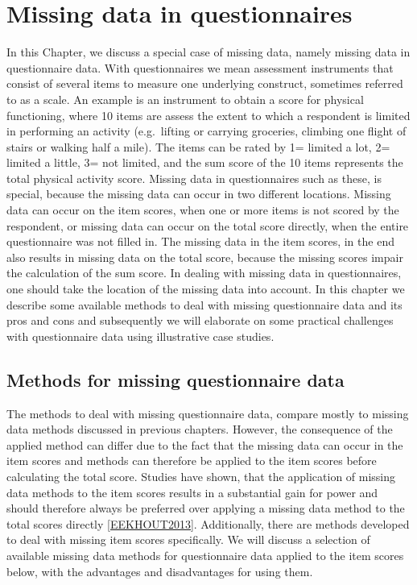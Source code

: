 \documentclass[]{book}
\begin{document}
\chapter{Missing data in
questionnaires}\label{missing-data-in-questionnaires}

In this Chapter, we discuss a special case of missing data, namely
missing data in questionnaire data. With questionnaires we mean
assessment instruments that consist of several items to measure one
underlying construct, sometimes referred to as a scale. An example is an
instrument to obtain a score for physical functioning, where 10 items
are assess the extent to which a respondent is limited in performing an
activity (e.g.~lifting or carrying groceries, climbing one flight of
stairs or walking half a mile). The items can be rated by 1= limited a
lot, 2= limited a little, 3= not limited, and the sum score of the 10
items represents the total physical activity score. Missing data in
questionnaires such as these, is special, because the missing data can
occur in two different locations. Missing data can occur on the item
scores, when one or more items is not scored by the respondent, or
missing data can occur on the total score directly, when the entire
questionnaire was not filled in. The missing data in the item scores, in
the end also results in missing data on the total score, because the
missing scores impair the calculation of the sum score. In dealing with
missing data in questionnaires, one should take the location of the
missing data into account. In this chapter we describe some available
methods to deal with missing questionnaire data and its pros and cons
and subsequently we will elaborate on some practical challenges with
questionnaire data using illustrative case studies.

\section{Methods for missing questionnaire
data}\label{methods-for-missing-questionnaire-data}

The methods to deal with missing questionnaire data, compare mostly to
missing data methods discussed in previous chapters. However, the
consequence of the applied method can differ due to the fact that the
missing data can occur in the item scores and methods can therefore be
applied to the item scores before calculating the total score. Studies
have shown, that the application of missing data methods to the item
scores results in a substantial gain for power and should therefore
always be preferred over applying a missing data method to the total
scores directly \ref{EEKHOUT2013}. Additionally, there are methods
developed to deal with missing item scores specifically. We will discuss
a selection of available missing data methods for questionnaire data
applied to the item scores below, with the advantages and disadvantages
for using them.
\end{document}
